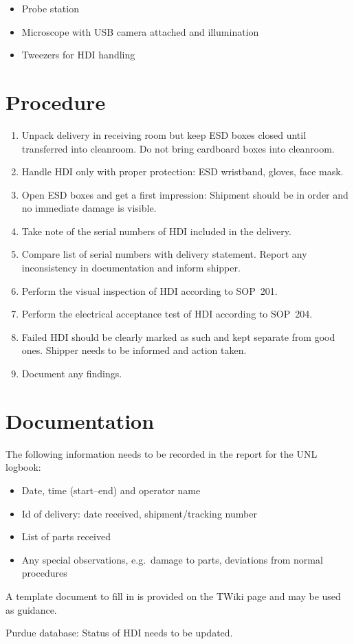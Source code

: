\documentclass[12pt]{unlsilabsop}
\begin{document}
\begin{itemize}
    \item Probe station
    \item Microscope with USB camera attached and illumination
    \item Tweezers for HDI handling
\end{itemize}

\section{Procedure}

\begin{enumerate}
    \item Unpack delivery in receiving room but keep ESD boxes closed until transferred into cleanroom. Do not bring cardboard boxes into cleanroom.
    \item Handle HDI only with proper protection: ESD wristband, gloves, face mask.
    \item Open ESD boxes and get a first impression: Shipment should be in order and no immediate damage is visible.
    \item Take note of the serial numbers of HDI included in the delivery.
    \item Compare list of serial numbers with delivery statement. Report any inconsistency in documentation and inform shipper.
    \item Perform the visual inspection of HDI according to SOP~201.
    \item Perform the electrical acceptance test of HDI according to SOP~204.
    \item Failed HDI should be clearly marked as such and kept separate from good ones. Shipper needs to be informed and action taken.
    \item Document any findings.
\end{enumerate}

\section{Documentation}
The following information needs to be recorded in the report for the UNL logbook:
\begin{itemize}
    \item Date, time (start--end) and operator name
    \item Id of delivery: date received, shipment/tracking number
    \item List of parts received
    \item Any special observations, e.g.~damage to parts, deviations from normal procedures
\end{itemize}
A template document to fill in is provided on the TWiki page and may be used as guidance.

Purdue database: Status of HDI needs to be updated.
\end{document}
